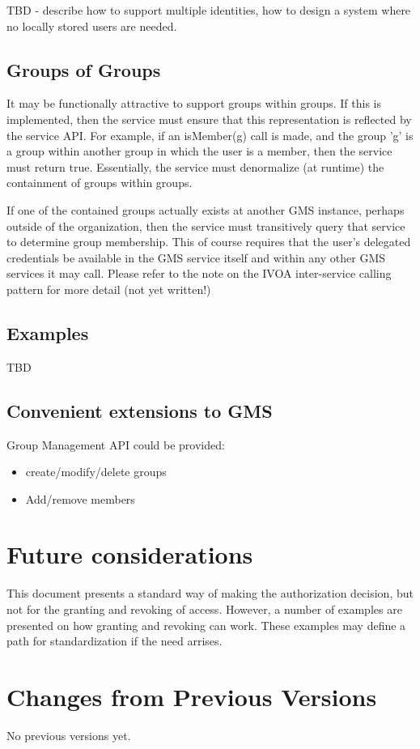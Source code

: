 \documentclass[11pt,a4paper]{ivoa}
\begin{document}
TBD - describe how to support multiple identities, how to design a system where no locally stored users are needed.

\subsection{Groups of Groups}

It may be functionally attractive to support groups within groups.  If this is implemented, then the service must ensure that this representation is reflected by the service API.  For example, if an isMember(g) call is made, and the group 'g' is a group within another group in which the user is a member, then the service must return true.  Essentially, the service must denormalize (at runtime) the containment of groups within groups.

If one of the contained groups actually exists at another GMS instance, perhaps outside of the organization, then the service must transitively query that service to determine group membership.  This of course requires that the user's delegated credentials be available in the GMS service itself and within any other GMS services it may call.  Please refer to the note on the IVOA inter-service calling pattern for more detail \citep{note:IVOSvcPatterns} (not yet written!)


\subsection {Examples}

TBD

\subsection {Convenient extensions to GMS}

Group Management API could be provided:
\begin{itemize}
\item create/modify/delete groups
\item Add/remove members
\end{itemize}

\section {Future considerations}

This document presents a standard way of making the authorization decision, but not for the granting and revoking of access.  However, a number of examples are presented on how granting and revoking can work.  These examples may define a path for standardization if the need arrises.

\appendix
\section{Changes from Previous Versions}

No previous versions yet.  



\end{document}
